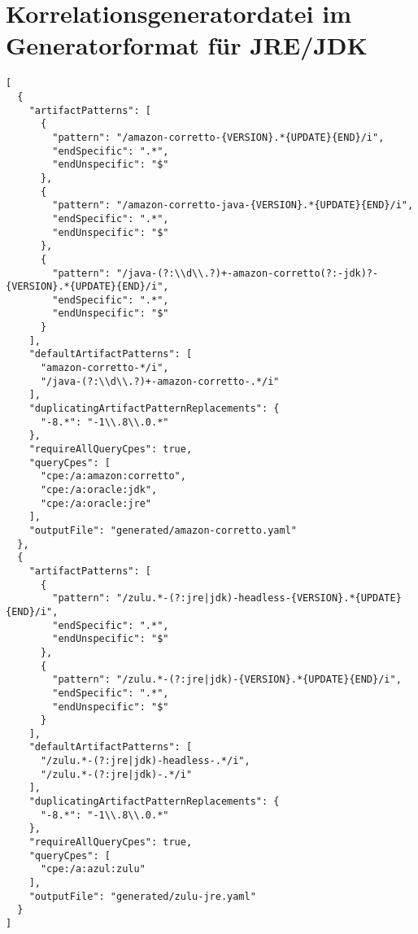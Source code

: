 \chapter{Korrelationsgeneratordatei im Generatorformat für JRE/JDK}\label{ch:generatorformat-jre-jdk}

\begin{lstlisting}[style=json,caption={Korrelationsgeneratordatei im Generatorformat für JRE/JDK},label={lst:correlation-generator-format-cpe-jre-jdk},basicstyle=\ttfamily\scriptsize]
[
  {
    "artifactPatterns": [
      {
        "pattern": "/amazon-corretto-{VERSION}.*{UPDATE}{END}/i",
        "endSpecific": ".*",
        "endUnspecific": "$"
      },
      {
        "pattern": "/amazon-corretto-java-{VERSION}.*{UPDATE}{END}/i",
        "endSpecific": ".*",
        "endUnspecific": "$"
      },
      {
        "pattern": "/java-(?:\\d\\.?)+-amazon-corretto(?:-jdk)?-{VERSION}.*{UPDATE}{END}/i",
        "endSpecific": ".*",
        "endUnspecific": "$"
      }
    ],
    "defaultArtifactPatterns": [
      "amazon-corretto-*/i",
      "/java-(?:\\d\\.?)+-amazon-corretto-.*/i"
    ],
    "duplicatingArtifactPatternReplacements": {
      "-8.*": "-1\\.8\\.0.*"
    },
    "requireAllQueryCpes": true,
    "queryCpes": [
      "cpe:/a:amazon:corretto",
      "cpe:/a:oracle:jdk",
      "cpe:/a:oracle:jre"
    ],
    "outputFile": "generated/amazon-corretto.yaml"
  },
  {
    "artifactPatterns": [
      {
        "pattern": "/zulu.*-(?:jre|jdk)-headless-{VERSION}.*{UPDATE}{END}/i",
        "endSpecific": ".*",
        "endUnspecific": "$"
      },
      {
        "pattern": "/zulu.*-(?:jre|jdk)-{VERSION}.*{UPDATE}{END}/i",
        "endSpecific": ".*",
        "endUnspecific": "$"
      }
    ],
    "defaultArtifactPatterns": [
      "/zulu.*-(?:jre|jdk)-headless-.*/i",
      "/zulu.*-(?:jre|jdk)-.*/i"
    ],
    "duplicatingArtifactPatternReplacements": {
      "-8.*": "-1\\.8\\.0.*"
    },
    "requireAllQueryCpes": true,
    "queryCpes": [
      "cpe:/a:azul:zulu"
    ],
    "outputFile": "generated/zulu-jre.yaml"
  }
]
\end{lstlisting}
